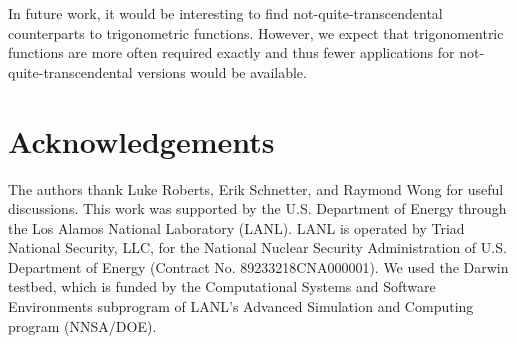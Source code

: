 \documentclass[a4paper,fleqn]{cas-sc}
\begin{document}
In future work, it would be interesting to find
not-quite-transcendental counterparts to trigonometric
functions. However, we expect that trigonomentric functions are more
often required exactly and thus fewer applications for
not-quite-transcendental versions would be available.

\section{Acknowledgements}
\label{sec:acknowledgements}

The authors thank Luke Roberts, Erik Schnetter, and Raymond Wong for
useful discussions. This work was supported by the U.S. Department of
Energy through the Los Alamos National Laboratory (LANL). LANL is
operated by Triad National Security, LLC, for the National Nuclear
Security Administration of U.S. Department of Energy (Contract
No. 89233218CNA000001). We used the Darwin testbed, which is funded by
the Computational Systems and Software Environments subprogram of
LANL's Advanced Simulation and Computing program (NNSA/DOE).


% 
% 



\end{document}
